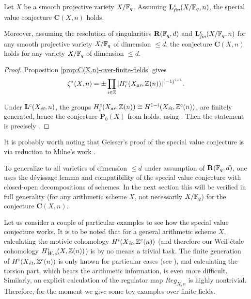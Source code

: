 \documentclass{article}
\numberwithin{equation}{section}
\begin{document}
\begin{theorem}
  \label{thm:C(X,n)-over-finite-fields}
  Let $X$ be a smooth projective variety $X/\FF_q$. Assuming
  $\mathbf{L}_\fin^c (X/\FF_q,n)$, the special value conjecture
  $\mathbf{C} (X,n)$ holds.

  Moreover, assuming the resolution of singularities $\mathbf{R} (\FF_q,d)$ and
  $\mathbf{L}_\fin^c (X/\FF_q,n)$ for any smooth projective variety $X/\FF_q$ of
  dimension $\le d$, the conjecture $\mathbf{C} (X,n)$ holds for any variety
  $X/\FF_q$ of dimension $\le d$.

  \begin{proof}
    Proposition \ref{prop:C(X,n)-over-finite-fields} gives
    \[ \zeta^* (X,n) =
      \pm \prod_{i \in \ZZ} |H_i^c (X_\ar, \ZZ (n))|^{(-1)^{i+1}}. \]

    Under $\mathbf{L}^c (X_\et,n)$, the groups
    $H_i^c (X_\ar, \ZZ(n)) \cong H^{1-i} (X_\et, \ZZ^c (n))$, are finitely
    generated, hence the conjecture $\mathbf{P}_0 (X)$ from
    \cite[\S 4]{Geisser-2010-arithmetic-homology} holds, using
    \cite[Proposition~4.1]{Geisser-2010-arithmetic-homology}.
    Then the statement is precisely
    \cite[Theorem~4.5]{Geisser-2010-arithmetic-homology}.
  \end{proof}
\end{theorem}

\begin{remark}
  It is probably worth noting that Geisser's proof of the special value
  conjecture is via reduction to Milne's work \cite{Milne-1986}.

  To generalize to all varieties of dimension $\le d$ under assumption of
  $\mathbf{R} (\FF_q,d)$, one uses the dévissage lemma
  \cite[Lemma~2.7]{Geisser-2006} and compatibility of the special value
  conjecture with closed-open decompositions of schemes. In the next section
  this will be verified in full generality (for any arithmetic scheme $X$, not
  necessarily $X/\FF_q$) for the conjecture $\mathbf{C} (X,n)$.
\end{remark}

Let us consider a couple of particular examples to see how the special value
conjecture works. It is to be noted that for a general arithmetic scheme $X$,
calculating the motivic cohomology $H^i (X_\et, \ZZ^c (n))$ (and therefore our
Weil-étale cohomology $H^i_\Wc (X, \ZZ(n))$) is by no means a trivial task. The
finite generation of $H^i (X_\et, \ZZ^c (n))$ is only known for particular cases
(see \cite[\S 8]{Beshenov-Weil-etale-1}), and calculating the torsion part,
which bears the arithmetic information, is even more difficult. Similarly, an
explicit calculation of the regulator map $Reg_{X,n}$ is highly
nontrivial. Therefore, for the moment we give some toy examples over finite
fields.
\end{document}
